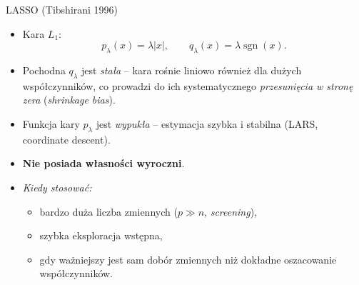 \documentclass[10pt,ignorenonframetext, aspectratio=169]{beamer}
\begin{document}
\begin{frame}{LASSO (Tibshirani 1996)}
\begin{itemize}
\justifying
    \item Kara $L_1$:
    \begin{equation*}
        p_{\lambda}(x) = \lambda |x|, \qquad q_{\lambda}(x) = \lambda \operatorname{sgn}(x).
    \end{equation*}
    \item Pochodna $q_\lambda$ jest \emph{stała} -- kara rośnie liniowo również dla dużych współczynników, co prowadzi do ich systematycznego \emph{przesunięcia w stronę zera} (\emph{shrinkage bias}).
    \item Funkcja kary $p_\lambda$ jest \emph{wypukła} -- estymacja szybka i stabilna (LARS, coordinate descent).
    \item \textbf{Nie posiada własności wyroczni}.
    \item \emph{Kiedy stosować:}
    \begin{itemize}
        \item bardzo duża liczba zmiennych ($p \gg n$, \emph{screening}),
        \item szybka eksploracja wstępna,
        \item gdy ważniejszy jest sam dobór zmiennych niż dokładne oszacowanie współczynników.
    \end{itemize}
\end{itemize}
\end{frame}
\end{document}
